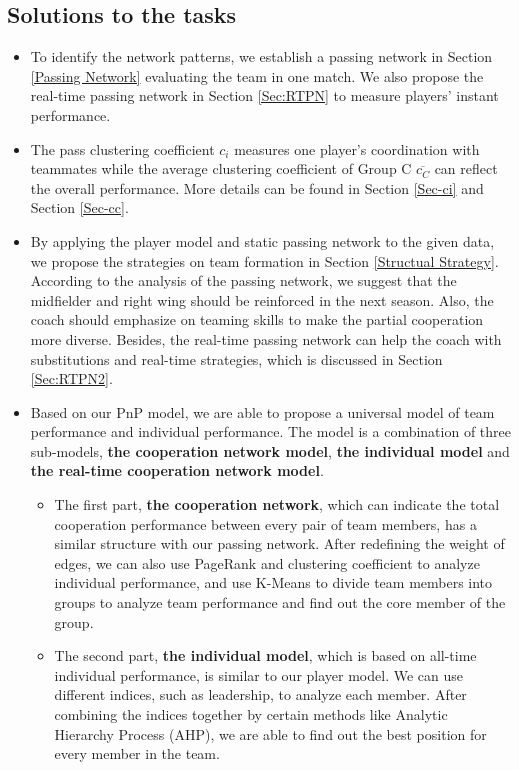 \documentclass{mcmthesis}
\begin{document}
\subsection{Solutions to the tasks}
\begin{itemize}
  \item To identify the network patterns, we establish a passing network in Section \ref{Passing Network} evaluating the team in one match. We also propose the real-time passing network in Section \ref{Sec:RTPN} to measure players' instant performance.
  \item The pass clustering coefficient $c_{i}$ measures one player's coordination with teammates while the average clustering coefficient of Group C $\overline{c_{C}}$ can reflect the overall performance. More details can be found in Section \ref{Sec-ci} and Section \ref{Sec-cc}.
  \item By applying the player model and static passing network to the given data, we propose the strategies on team formation in Section \ref{Structual Strategy}. According to the analysis of the passing network, we suggest that the midfielder and right wing should be reinforced in the next season. Also, the coach should emphasize on teaming skills to make the partial cooperation more diverse. Besides, the real-time passing network can help the coach with substitutions and real-time strategies, which is discussed in Section \ref{Sec:RTPN2}.
  \item Based on our PnP model, we are able to propose a universal model of team performance and individual performance. The model is a combination of three sub-models, \textbf{the cooperation network model}, \textbf{the individual model} and \textbf{the real-time cooperation network model}.
    \begin{itemize}
        \item The first part, \textbf{the cooperation network}, which can indicate the total cooperation performance between every pair of team members, has a similar structure with our passing network. After redefining the weight of edges, we can also use PageRank and clustering coefficient to analyze individual performance, and use K-Means to divide team members into groups to analyze team performance and find out the core member of the group.
        \item  The second part, \textbf{the individual model}, which is based on all-time individual performance, is similar to our player model. We can use different indices, such as leadership, to analyze each member. After combining the indices together by certain methods like Analytic Hierarchy Process (AHP), we are able to find out the best position for every member in the team.

\end{itemize}
\end{itemize}
\end{document}
